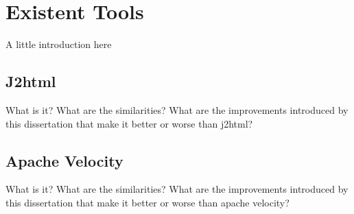\chapter{Existent Tools}
\label{cha:tools}

A little introduction here

\section{J2html} %
\label{sec:j2html}

What is it? What are the similarities? What are the improvements introduced by this dissertation that make it better or worse than j2html?

\section{Apache Velocity} %
\label{sec:apachevelocity}

What is it? What are the similarities? What are the improvements introduced by this dissertation that make it better or worse than apache velocity?
